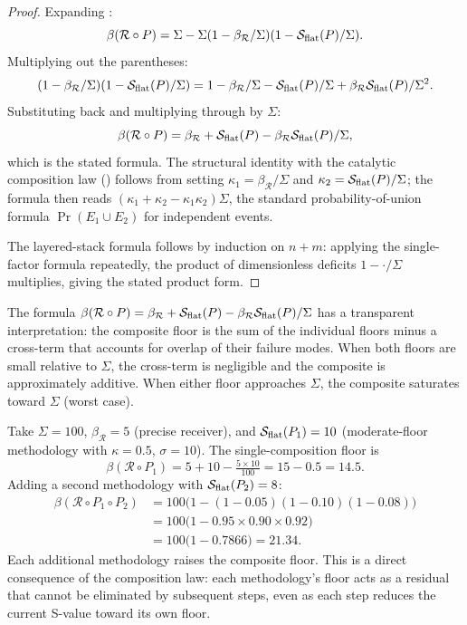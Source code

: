 \begin{proof}
Expanding :
\[
  \beta(\mathcal{R} \circ P)
  = \Sigma - \Sigma(1 - \beta_\mathcal{R}/\Sigma)(1 - \mathcal{S}_{\mathrm{flat}}(P)/\Sigma) .
\]
Multiplying out the parentheses:
\[
  (1 - \beta_\mathcal{R}/\Sigma)(1 - \mathcal{S}_{\mathrm{flat}}(P)/\Sigma)
  = 1 - \beta_\mathcal{R}/\Sigma - \mathcal{S}_{\mathrm{flat}}(P)/\Sigma
  + \beta_\mathcal{R} \mathcal{S}_{\mathrm{flat}}(P)/\Sigma^2 .
\]
Substituting back and multiplying through by $\Sigma$:
\[
  \beta(\mathcal{R} \circ P)
  = \beta_\mathcal{R} + \mathcal{S}_{\mathrm{flat}}(P)
  - \beta_\mathcal{R} \mathcal{S}_{\mathrm{flat}}(P)/\Sigma ,
\]
which is the stated formula.  The structural identity with the catalytic
composition law () follows from setting
$\kappa_1 = \beta_\mathcal{R}/\Sigma$ and $\kappa_2 =
\mathcal{S}_{\mathrm{flat}}(P)/\Sigma$; the formula then reads
$(\kappa_1 + \kappa_2 - \kappa_1 \kappa_2)\Sigma$, the standard
probability-of-union formula $\Pr(E_1 \cup E_2)$ for independent events.

The layered-stack formula follows by induction on $n + m$: applying the
single-factor formula repeatedly, the product of dimensionless deficits
$1 - \cdot/\Sigma$ multiplies, giving the stated product form.
\end{proof}

\begin{remark}
\label{rem:floor-composition}
The formula $\beta(\mathcal{R} \circ P) = \beta_\mathcal{R} +
\mathcal{S}_{\mathrm{flat}}(P) - \beta_\mathcal{R} \mathcal{S}_{\mathrm{flat}}(P)/\Sigma$
has a transparent interpretation: the composite floor is the sum of the
individual floors minus a cross-term that accounts for overlap of their
failure modes.  When both floors are small relative to $\Sigma$, the
cross-term is negligible and the composite is approximately additive.
When either floor approaches $\Sigma$, the composite saturates toward
$\Sigma$ (worst case).
\end{remark}

\begin{example}
\label{ex:floor-composition-numerical}
Take $\Sigma = 100$, $\beta_\mathcal{R} = 5$ (precise receiver), and
$\mathcal{S}_{\mathrm{flat}}(P_1) = 10$ (moderate-floor methodology with
$\kappa = 0.5$, $\sigma = 10$).  The single-composition floor is
\[
  \beta(\mathcal{R} \circ P_1) = 5 + 10 - \tfrac{5 \times 10}{100}
  = 15 - 0.5 = 14.5 .
\]
Adding a second methodology with $\mathcal{S}_{\mathrm{flat}}(P_2) = 8$:
\begin{align*}
  \beta(\mathcal{R} \circ P_1 \circ P_2)
  &= 100\bigl(1 - (1 - 0.05)(1 - 0.10)(1 - 0.08)\bigr) \\
  &= 100\bigl(1 - 0.95 \times 0.90 \times 0.92\bigr) \\
  &= 100\bigl(1 - 0.7866\bigr) = 21.34 .
\end{align*}
Each additional methodology raises the composite floor.  This is a direct
consequence of the composition law: each methodology's floor acts as a
residual that cannot be eliminated by subsequent steps, even as each step
reduces the current S-value toward its own floor.
\end{example}

